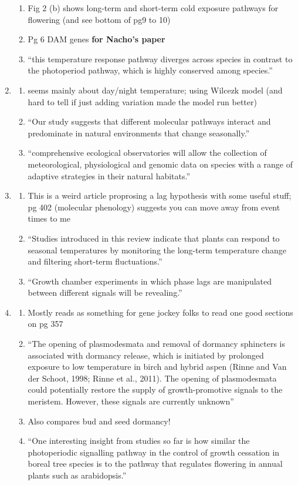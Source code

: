 \documentclass[11pt,letter]{article}
\begin{document}
\begin{enumerate}
\begin{enumerate}
\item Fig 2 (b) shows long-term and short-term cold exposure pathways for flowering (and see bottom of pg9 to 10)
\item Pg 6 DAM genes {\bf for Nacho's paper}
\item ``this temperature response pathway diverges across species in contrast to the photoperiod pathway, which is highly conserved among species.''
\end{enumerate} 
\item \cite{Chew:2012pd} 
\begin{enumerate} 
\item seems mainly about day/night temperature; using Wilcezk model (and hard to tell if just adding variation made the model run better) 
\item ``Our study suggests that different molecular pathways interact and predominate in natural environments that change seasonally.''
\item ``comprehensive ecological observatories will allow the collection of meteorological, physiological and genomic data on species with a range of adaptive strategies in their natural habitats.''
\end{enumerate} 
\item \cite{kudoh2016} 
\begin{enumerate} 
\item This is a weird article proprosing a lag hypothesis with some useful stuff; pg 402 (molecular phenology) suggests you can move away from event times to me
\item ``Studies introduced in this review indicate that plants can respond to seasonal temperatures by monitoring the long-term temperature  change and filtering short-term fluctuations.''
\item ``Growth chamber experiments in which phase lags are manipulated between different signals will be revealing.''
\end{enumerate} 
\item \cite{Maurya2017}
\begin{enumerate} 
\item Mostly reads as something for gene jockey folks to read one good sections on pg 357 
\item ``The opening of plasmodesmata and removal of dormancy sphincters is associated with dormancy release, which is initiated by prolonged exposure to low temperature in birch and hybrid aspen (Rinne and Van der Schoot, 1998; Rinne
et al., 2011). The opening of plasmodesmata could potentially restore the supply of growth-promotive signals to the meristem. However, these signals are currently unknown''
\item Also compares bud and seed dormancy!
\item ``One interesting insight from studies so far is how similar the photoperiodic signalling pathway in the control of growth cessation in boreal tree species is to the pathway that regulates flowering in annual plants such as arabidopsis.''
\end{enumerate} 
\end{enumerate} 
\end{document}
